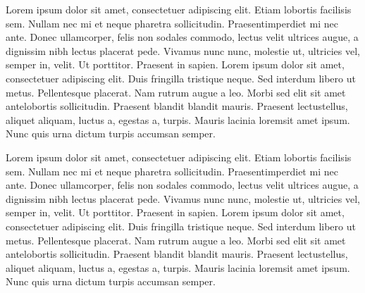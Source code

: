 Lorem ipsum dolor sit amet, consectetuer adipiscing elit. Etiam lobortis facilisis sem. Nullam nec mi et neque pharetra sollicitudin. Praesentimperdiet mi nec ante. Donec ullamcorper, felis non sodales commodo, lectus velit ultrices augue, a dignissim nibh lectus placerat pede. Vivamus nunc nunc, molestie ut, ultricies vel, semper in, velit. Ut porttitor. Praesent in sapien. Lorem ipsum dolor sit amet, consectetuer adipiscing elit. Duis fringilla tristique neque. Sed interdum libero ut metus. Pellentesque placerat. Nam rutrum augue a leo. Morbi sed elit sit amet antelobortis sollicitudin. Praesent blandit blandit mauris. Praesent lectustellus, aliquet aliquam, luctus a, egestas a, turpis. Mauris lacinia loremsit amet ipsum. Nunc quis urna dictum turpis accumsan semper.

Lorem ipsum dolor sit amet, consectetuer adipiscing elit. Etiam lobortis facilisis sem. Nullam nec mi et neque pharetra sollicitudin. Praesentimperdiet mi nec ante. Donec ullamcorper, felis non sodales commodo, lectus velit ultrices augue, a dignissim nibh lectus placerat pede. Vivamus nunc nunc, molestie ut, ultricies vel, semper in, velit. Ut porttitor. Praesent in sapien. Lorem ipsum dolor sit amet, consectetuer adipiscing elit. Duis fringilla tristique neque. Sed interdum libero ut metus. Pellentesque placerat. Nam rutrum augue a leo. Morbi sed elit sit amet antelobortis sollicitudin. Praesent blandit blandit mauris. Praesent lectustellus, aliquet aliquam, luctus a, egestas a, turpis. Mauris lacinia loremsit amet ipsum. Nunc quis urna dictum turpis accumsan semper.